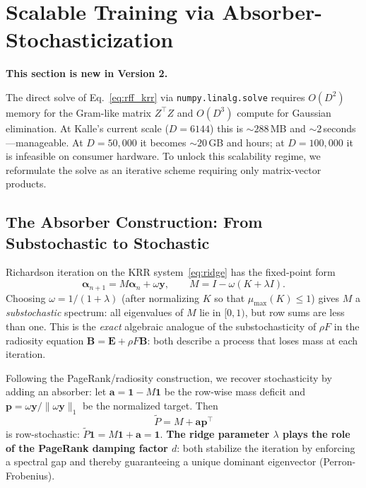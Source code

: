 \documentclass[11pt,a4paper]{article}
\begin{document}
\section{Scalable Training via Absorber-Stochasticization}\label{sec:v2}

\textbf{This section is new in Version 2.}

The direct solve of Eq.~\eqref{eq:rff_krr} via \texttt{numpy.linalg.solve} requires $O(D^2)$ memory for the Gram-like matrix $Z^\top Z$ and $O(D^3)$ compute for Gaussian elimination. At Kalle's current scale ($D = 6144$) this is $\sim 288$\,MB and $\sim 2$\,seconds---manageable. At $D = 50{,}000$ it becomes $\sim 20$\,GB and hours; at $D = 100{,}000$ it is infeasible on consumer hardware. To unlock this scalability regime, we reformulate the solve as an iterative scheme requiring only matrix-vector products.

\subsection{The Absorber Construction: From Substochastic to Stochastic}

Richardson iteration on the KRR system~\eqref{eq:ridge} has the fixed-point form
\begin{equation}
  \boldsymbol{\alpha}_{n+1} = M \boldsymbol{\alpha}_n + \omega \mathbf{y}, \qquad M = I - \omega(K + \lambda I). \label{eq:richardson}
\end{equation}
Choosing $\omega = 1/(1+\lambda)$ (after normalizing $K$ so that $\mu_{\max}(K) \leq 1$) gives $M$ a \emph{substochastic} spectrum: all eigenvalues of $M$ lie in $[0, 1)$, but row sums are less than one. This is the \emph{exact} algebraic analogue of the substochasticity of $\rho F$ in the radiosity equation $\mathbf{B} = \mathbf{E} + \rho F \mathbf{B}$: both describe a process that loses mass at each iteration.

Following the PageRank/radiosity construction, we recover stochasticity by adding an absorber: let $\mathbf{a} = \mathbf{1} - M\mathbf{1}$ be the row-wise mass deficit and $\mathbf{p} = \omega \mathbf{y} / \|\omega \mathbf{y}\|_1$ be the normalized target. Then
\begin{equation}
  \tilde P = M + \mathbf{a}\mathbf{p}^\top \label{eq:absorber}
\end{equation}
is row-stochastic: $\tilde P \mathbf{1} = M \mathbf{1} + \mathbf{a} = \mathbf{1}$. \textbf{The ridge parameter $\lambda$ plays the role of the PageRank damping factor $d$}: both stabilize the iteration by enforcing a spectral gap and thereby guaranteeing a unique dominant eigenvector (Perron-Frobenius).
\end{document}
